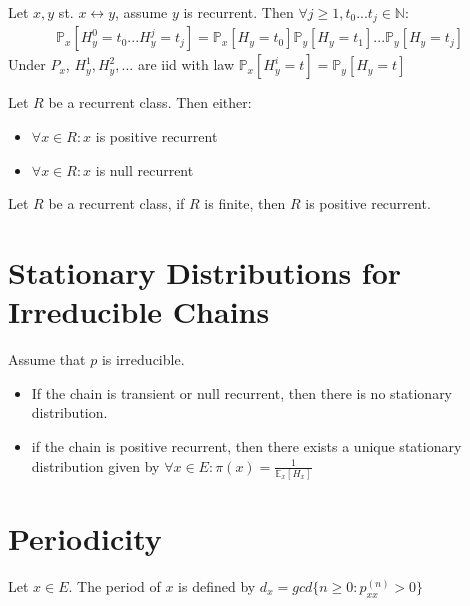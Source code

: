 \begin{lemma}[]
	Let $x,y$ st. $x \leftrightarrow y$, assume $y$ is recurrent. Then $\forall j \geq 1, t_0...t_j \in \mathbb{N}$:
\begin{align}
	\mathbb{P}_{x} \left[ H_y^0=t_0...H_y^j=t_j \right] = \mathbb{P}_{x} \left[ H_y=t_0 \right] \mathbb{P}_{y} \left[ H_y=t_1 \right] ... \mathbb{P}_{y} \left[ H_y=t_j \right] 
\end{align}
Under $P_x$, $H_y^1,H_y^2,...$ are iid with law $\mathbb{P}_{x} \left[ H_y^i=t \right] = \mathbb{P}_{y} \left[ H_y=t \right] $
\end{lemma}

\begin{prop}
	Let $R$ be a recurrent class. Then either:
\begin{itemize}
	\item $\forall x \in R: x$ is positive recurrent
	\item $\forall x \in R: x$ is null recurrent
\end{itemize}

\end{prop}

\begin{prop}[]
	Let $R$ be a recurrent class, if $R$ is finite, then $R$ is positive recurrent.
\end{prop}

\section{Stationary Distributions for Irreducible Chains}
\begin{theorem}[]
	Assume that $p$ is irreducible. 
\begin{itemize}
	\item If the chain is transient or null recurrent, then there is no stationary distribution.
	\item if the chain is positive recurrent, then there exists a unique stationary distribution given by $\forall x \in E: \pi (x) = \frac{1}{\mathbb{E}_{x} \left[ H_x \right] }$
\end{itemize}

\end{theorem}

\section{Periodicity}
\begin{defn}
	Let $x \in E$. The period of $x$ is defined by $d_x = gcd\{n\geq 0: p_{xx}^{(n)}>0\}$
\end{defn}

